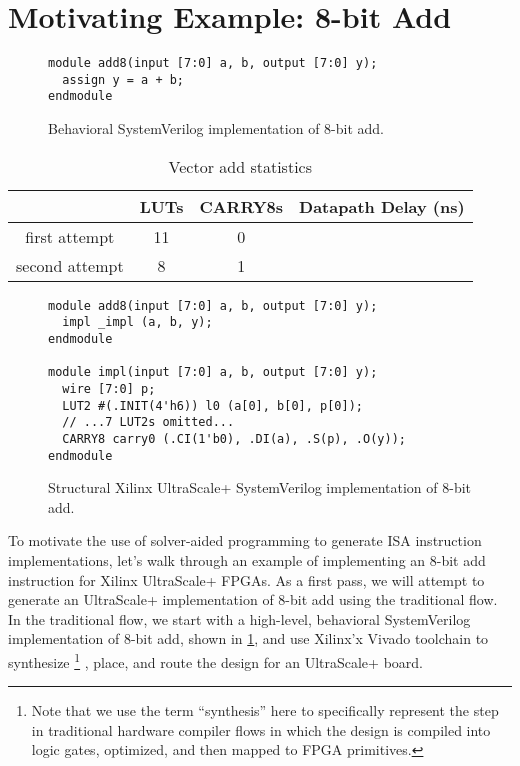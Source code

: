 \section{Motivating Example: 8-bit Add}
\label{sec:motivating-example}


\begin{figure}
\begin{verbatim}
module add8(input [7:0] a, b, output [7:0] y);
  assign y = a + b;
endmodule
\end{verbatim}
\caption{Behavioral SystemVerilog implementation of 8-bit add.}
\label{fig:8-bit-add-behavioral}
\end{figure}
  
\begin{table}
    \centering
    \begin{tabular}{c|ccc}
        & LUTs & CARRY8s & Datapath Delay (ns)  \\
        \hline
         first attempt& 11 & 0 & {\color{red}{0.799}}  \\
         second attempt& 8 & 1&  {\color{OliveGreen}{0.410}}  \\
    \end{tabular}
    \caption{Vector add statistics}
    \label{tab:vector-add-stats}
\end{table}
  
\begin{figure}
\begin{verbatim}
module add8(input [7:0] a, b, output [7:0] y);
  impl _impl (a, b, y);
endmodule

module impl(input [7:0] a, b, output [7:0] y);
  wire [7:0] p;
  LUT2 #(.INIT(4'h6)) l0 (a[0], b[0], p[0]);
  // ...7 LUT2s omitted...
  CARRY8 carry0 (.CI(1'b0), .DI(a), .S(p), .O(y));
endmodule
\end{verbatim}
\caption{Structural Xilinx UltraScale+ SystemVerilog implementation of 8-bit add.}
\label{fig:8-bit-add-structural}
\end{figure}

To motivate the use
  of solver-aided programming
  to generate ISA instruction implementations,
  let's walk through an example
  of implementing an 8-bit add instruction
  for Xilinx UltraScale+ FPGAs.
As a first pass,
  we will attempt to 
  generate an UltraScale+ implementation
  of 8-bit add
  using the traditional flow.
In the traditional flow, we start with 
  a high-level,
  behavioral SystemVerilog implementation
  of 8-bit add,
  shown in \cref{fig:8-bit-add-behavioral},
  and use Xilinx'x Vivado toolchain
  to synthesize%
  \footnote{Note that we use the term ``synthesis'' here to specifically represent the step in traditional hardware compiler flows in which the design is compiled into logic gates, optimized, and then mapped to FPGA primitives.}
  , place, and route the design
  for an UltraScale+ board.

